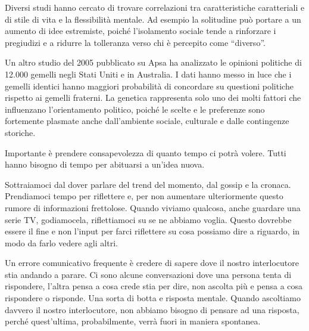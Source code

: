 \documentclass[12pt]{book} %
\begin{document}
Diversi studi hanno cercato di trovare correlazioni tra caratteristiche caratteriali e di stile di vita e la flessibilità mentale. Ad esempio la solitudine può portare a un aumento di idee estremiste, poiché l’isolamento sociale tende a rinforzare i pregiudizi e a ridurre la tolleranza verso chi è percepito come “diverso”.

Un altro studio del 2005 pubblicato su Apsa ha analizzato le opinioni politiche di 12.000 gemelli negli Stati Uniti e in Australia. I dati hanno messo in luce
che i gemelli identici hanno maggiori probabilità di concordare su questioni politiche rispetto ai gemelli fraterni.
La genetica rappresenta solo uno dei molti fattori che influenzano l'orientamento politico, poiché le scelte e le preferenze sono fortemente plasmate anche dall'ambiente sociale, culturale e dalle contingenze storiche.

Importante è prendere consapevolezza di quanto tempo ci potrà volere. Tutti hanno bisogno di tempo per abituarsi a un'idea nuova.

Sottraiamoci dal dover parlare del trend del momento, dal gossip e la cronaca. Prendiamoci tempo per riflettere e, per non aumentare ulteriormente questo rumore di informazioni frettolose. Quando viviamo qualcosa, anche guardare una serie TV, godiamocela, riflettiamoci su se ne abbiamo voglia. Questo dovrebbe essere il fine e non l'input per farci riflettere su cosa possiamo dire a riguardo, in modo da farlo vedere agli altri.

Un errore comunicativo frequente è credere di sapere dove il nostro interlocutore stia andando a
parare. Ci sono alcune conversazioni dove una persona tenta di
rispondere, l'altra pensa a cosa crede stia per dire, non ascolta più e pensa a cosa rispondere o risponde.
Una sorta di botta e risposta mentale. Quando ascoltiamo davvero il nostro interlocutore, non
abbiamo bisogno di pensare ad una risposta, perché quest'ultima, probabilmente, verrà fuori in maniera spontanea.
\end{document}
